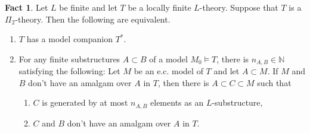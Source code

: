 \documentclass[11pt,reqno]{article}
\theoremstyle{definition}
\newtheorem{fact}[theorem]{Fact}
\theoremstyle{remark}
\begin{document}
\begin{fact}\label{fact:locally finiteness and model companion}
    Let $L$ be finite and let $T$ be a locally finite $L$-theory.
    Suppose that $T$ is a $\Pi_2$-theory.
    Then the following are equivalent.
    \begin{enumerate}
        \item $T$ has a model companion $T^*$.
        \item For any finite substructures $A\subset B$ of a model $M_0\models T$, there is $n_{A,B}\in \mathbb N$ satisfying the following: 
        Let $M$ be an e.c. model of $T$ and let $A\subset M$. 
        If $M$ and $B$ don't have an amalgam over $A$ in $T$, then there is $A\subset C\subset M$ such that
        \begin{enumerate}
            \item $C$ is generated by at most $n_{A,B}$ elements as an $L$-substructure,
            \item $C$ and $B$ don't have an amalgam over $A$ in $T$.
        \end{enumerate}   
    \end{enumerate}
\end{fact}
\end{document}
